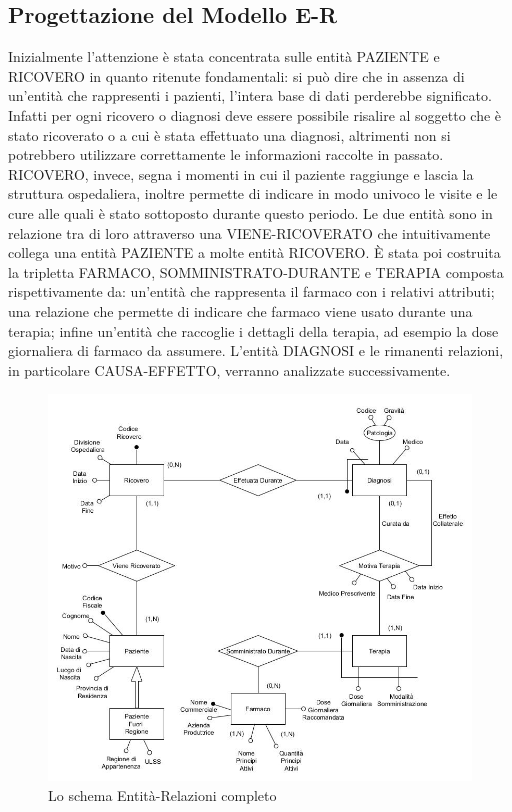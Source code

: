 \documentclass{article}
\begin{document}
\clearpage
\subsection{Progettazione del Modello E-R}
Inizialmente l'attenzione è stata concentrata sulle entità PAZIENTE e RICOVERO in quanto ritenute fondamentali: si può dire che in assenza di un'entità che rappresenti i pazienti, l'intera base di dati perderebbe significato.
Infatti per ogni ricovero o diagnosi deve essere possibile risalire al soggetto che è stato ricoverato o a cui è stata effettuato una diagnosi, altrimenti non si potrebbero utilizzare correttamente le informazioni raccolte in passato.
RICOVERO, invece, segna i momenti in cui il paziente raggiunge e lascia la struttura ospedaliera, inoltre permette di indicare in modo univoco le visite e le cure alle quali è stato sottoposto durante questo periodo.
Le due entità sono in relazione tra di loro attraverso una VIENE-RICOVERATO che intuitivamente collega una entità PAZIENTE a molte entità RICOVERO.
È stata poi costruita la tripletta FARMACO, SOMMINISTRATO-DURANTE e TERAPIA composta rispettivamente da: un'entità che rappresenta il farmaco con i relativi attributi; una relazione che permette di indicare che farmaco viene usato durante una terapia; infine un'entità che raccoglie i dettagli della terapia, ad esempio la dose giornaliera di farmaco da assumere.
L'entità DIAGNOSI e le rimanenti relazioni, in particolare CAUSA-EFFETTO, verranno analizzate successivamente.


\begin{figure} %
  \centering
  \includegraphics[width=\linewidth]{schema1.jpg}
  \caption{Lo schema Entità-Relazioni completo}
  \label{schema_ER_progettazione_modello}
\end{figure}
\end{document}
